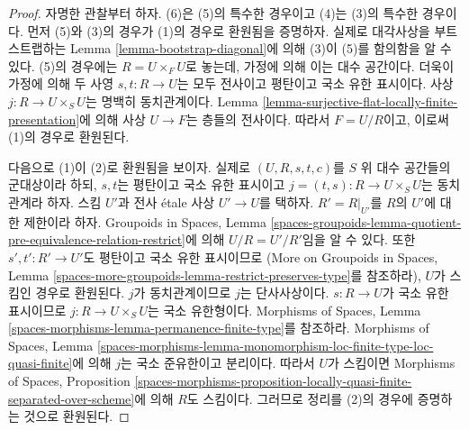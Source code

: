 \begin{proof}
자명한 관찰부터 하자. (6)은 (5)의 특수한 경우이고
(4)는 (3)의 특수한 경우이다.
먼저 (5)와 (3)의 경우가 (1)의 경우로 환원됨을 증명하자.
실제로 대각사상을 부트스트랩하는
Lemma \ref{lemma-bootstrap-diagonal}에 의해
(3)이 (5)를 함의함을 알 수 있다. (5)의 경우에는
$R = U \times_F U$로 놓는데, 가정에 의해 이는 대수 공간이다.
더욱이 가정에 의해 두 사영 $s, t : R \to U$는 모두
전사이고 평탄이고 국소 유한 표시이다.
사상 $j : R \to U \times_S U$는 명백히 동치관계이다.
Lemma \ref{lemma-surjective-flat-locally-finite-presentation}에 의해
사상 $U \to F$는 층들의 전사이다. 따라서 $F = U/R$이고,
이로써 (1)의 경우로 환원된다.

\medskip\noindent
다음으로 (1)이 (2)로 환원됨을 보이자.
실제로 $(U, R, s, t, c)$를 $S$ 위 대수 공간들의 군대상이라 하되,
$s, t$는 평탄이고 국소 유한 표시이고
$j = (t, s) : R \to U \times_S U$는 동치관계라 하자.
스킴 $U'$과 전사 \'etale 사상 $U' \to U$를 택하자.
$R' = R|_{U'}$를 $R$의 $U'$에 대한 제한이라 하자.
Groupoids in Spaces,
Lemma \ref{spaces-groupoids-lemma-quotient-pre-equivalence-relation-restrict}에
의해 $U/R = U'/R'$임을 알 수 있다. 또한
$s', t' : R' \to U'$도 평탄이고 국소 유한 표시이므로
(More on Groupoids in Spaces,
Lemma \ref{spaces-more-groupoids-lemma-restrict-preserves-type}를 참조하라),
$U$가 스킴인 경우로 환원된다.
$j$가 동치관계이므로 $j$는 단사사상이다.
$s : R \to U$가 국소 유한 표시이므로
$j : R \to U \times_S U$는 국소 유한형이다. Morphisms of Spaces,
Lemma \ref{spaces-morphisms-lemma-permanence-finite-type}를 참조하라.
Morphisms of Spaces, Lemma
\ref{spaces-morphisms-lemma-monomorphism-loc-finite-type-loc-quasi-finite}에
의해 $j$는 국소 준유한이고 분리이다.
따라서 $U$가 스킴이면 Morphisms of Spaces, Proposition
\ref{spaces-morphisms-proposition-locally-quasi-finite-separated-over-scheme}에
의해 $R$도 스킴이다.
그러므로 정리를 (2)의 경우에 증명하는 것으로 환원된다.


\end{proof}
